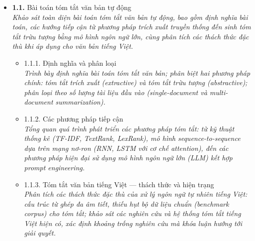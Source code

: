 \documentclass[a4paper,12pt]{article}
\begin{document}
\begin{itemize}[leftmargin=1cm, labelsep=0.3cm, itemsep=1pt, label={}]
  \item \textbf{1.1.} Bài toán tóm tắt văn bản tự động \\
  {\small\itshape Khảo sát toàn diện bài toán tóm tắt văn bản tự động, bao gồm định nghĩa bài toán, các hướng tiếp cận từ phương pháp trích xuất truyền thống đến sinh tóm tắt trừu tượng bằng mô hình ngôn ngữ lớn, cùng phân tích các thách thức đặc thù khi áp dụng cho văn bản tiếng Việt.}
  \begin{itemize}[leftmargin=1cm, itemsep=0pt, label={}]
    \item 1.1.1. Định nghĩa và phân loại \\
      {\small\itshape Trình bày định nghĩa bài toán tóm tắt văn bản; phân biệt hai phương pháp chính: tóm tắt trích xuất (extractive) và tóm tắt trừu tượng (abstractive); phân loại theo số lượng tài liệu đầu vào (single-document và multi-document summarization).}
    \item 1.1.2. Các phương pháp tiếp cận \\
      {\small\itshape Tổng quan quá trình phát triển các phương pháp tóm tắt: từ kỹ thuật thống kê (TF-IDF, TextRank, LexRank), mô hình sequence-to-sequence dựa trên mạng nơ-ron (RNN, LSTM với cơ chế attention), đến các phương pháp hiện đại sử dụng mô hình ngôn ngữ lớn (LLM) kết hợp prompt engineering.}
    \item 1.1.3. Tóm tắt văn bản tiếng Việt — thách thức và hiện trạng \\
      {\small\itshape Phân tích các thách thức đặc thù của xử lý ngôn ngữ tự nhiên tiếng Việt: cấu trúc từ ghép đa âm tiết, thiếu hụt bộ dữ liệu chuẩn (benchmark corpus) cho tóm tắt; khảo sát các nghiên cứu và hệ thống tóm tắt tiếng Việt hiện có, xác định khoảng trống nghiên cứu mà khóa luận hướng tới giải quyết.}
  \end{itemize}


\end{itemize}
\end{document}
